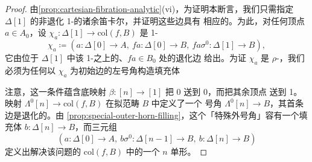 \begin{proof}
由\cref{prop:cartesian-fibration-analytic}(vi)，为证明本断言，我们只需指定
$\Delta[1]$ 的非退化 1-\trSimplex{}的诸余笛卡尔\trLifting，并证明这些边具有
相应的\trUniversalProperty。为此，对任何顶点 $a\in A_{0}$，设
$\chi_{a}\colon\Delta[1]\to\mathrm{col}(f,B)$ 是 1-\trSimplex
\[
\chi_{a}\coloneqq(a\colon\Delta[0]\to A,\ fa\colon\Delta[0]\to B,\ fa\sigma^{0}\colon\Delta[1]\to B),
\]
它由位于 $\Delta[1]$ 中该 1-\trSimplex{}之上的、$fa\in B_{0}$ 处的退化边
给出。为证 $\chi_{a}$ 是 $\rho$-\trCocartesian，我们必须为任何以 $\chi_{a}$
为初始边的左号角构造填充体
\begin{center}
\end{center}
注意，这一条件蕴含底映射 $\beta\colon[n]\to[1]$ 把 0 送到 0，而把其余顶点
送到 1。映射 $\Lambda^{0}[n]\to\mathrm{col}(f,B)$ 在拟范畴 $B$ 中定义了一个
号角 $\Lambda^{0}[n]\to B$，其首条边是退化的。由
\cref{prop:special-outer-horn-filling}，这个「特殊外号角」容有一个填充体
$b\colon\Delta[n]\to B$，而三元组
\[
(a\colon\Delta[0]\to A,\ b\sigma^{0}\colon\Delta[n-1]\to B,\ b\colon\Delta[n]\to B)
\]
定义出解决该\trLifting{}问题的 $\mathrm{col}(f,B)$ 中的一个 $n$ 单形。
\end{proof}

